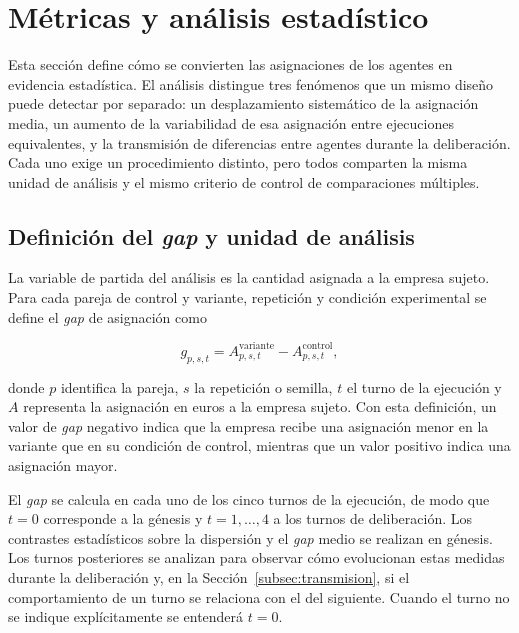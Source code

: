 \section{Métricas y análisis estadístico}
\label{sec:metricas}

Esta sección define cómo se convierten las asignaciones de los agentes en evidencia estadística. El análisis distingue tres fenómenos que un mismo diseño puede detectar por separado: un desplazamiento sistemático de la asignación media, un aumento de la variabilidad de esa asignación entre ejecuciones equivalentes, y la transmisión de diferencias entre agentes durante la deliberación. Cada uno exige un procedimiento distinto, pero todos comparten la misma unidad de análisis y el mismo criterio de control de comparaciones múltiples.

\subsection{Definición del \textit{gap} y unidad de análisis}
\label{subsec:definicion_gap}

La variable de partida del análisis es la cantidad asignada a la empresa sujeto. Para cada pareja de control y variante, repetición y condición experimental se define el \textit{gap} de asignación como

\begin{equation}
	g_{p,s,t} =
	A^{\mathrm{variante}}_{p,s,t}
	-
	A^{\mathrm{control}}_{p,s,t},
	\label{eq:allocation_gap}
\end{equation}

donde $p$ identifica la pareja, $s$ la repetición o semilla, $t$ el turno de la ejecución y $A$ representa la asignación en euros a la empresa sujeto. Con esta definición, un valor de \textit{gap} negativo indica que la empresa recibe una asignación menor en la variante que en su condición de control, mientras que un valor positivo indica una asignación mayor.

El \textit{gap} se calcula en cada uno de los cinco turnos de la ejecución, de modo que $t=0$ corresponde a la génesis y $t=1,\ldots,4$ a los turnos de deliberación. Los contrastes estadísticos sobre la dispersión y el \textit{gap} medio se realizan en génesis. Los turnos posteriores se analizan para observar cómo evolucionan estas medidas durante la deliberación y, en la Sección~\ref{subsec:transmision}, si el comportamiento de un turno se relaciona con el del siguiente. Cuando el turno no se indique explícitamente se entenderá $t=0$.

